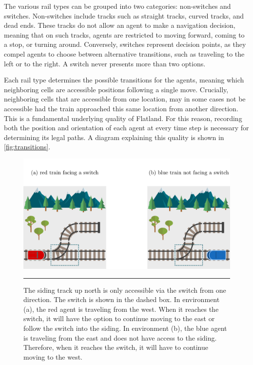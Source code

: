 \documentclass[11pt]{article}
\begin{document}
The various rail types can be grouped into two categories: non-switches and switches.  Non-switches include tracks such as straight tracks, curved tracks, and dead ends.  These tracks do not allow an agent to make a navigation decision, meaning that on such tracks, agents are restricted to moving forward, coming to a stop, or turning around.  Conversely, switches represent decision points, as they compel agents to choose between alternative transitions, such as traveling to the left or to the right.  A switch never presents more than two options.

Each rail type determines the possible transitions for the agents, meaning which neighboring cells are accessible positions following a single move.  Crucially, neighboring cells that are accessible from one location, may in some cases not be accessible had the train approached this same location from another direction.  This is a fundamental underlying quality of Flatland.  For this reason, recording both the position and orientation of each agent at every time step is necessary for determining its legal paths.  A diagram explaining this quality is shown in \autoref{fig:transitions}.

\begin{figure}[t]
\centering
\includegraphics[width=\textwidth]{transitions}
\caption{The siding track up north is only accessible via the switch from one direction.  The switch is shown in the dashed box.  In environment (a), the red agent is traveling from the west.  When it reaches the switch, it will have the option to continue moving to the east or follow the switch into the siding.  In environment (b), the blue agent is traveling from the east and does not have access to the siding.  Therefore, when it reaches the switch, it will have to continue moving to the west.}

\begin{center}
{\color{lightgray} \rule{\linewidth}{0.15mm}}
\end{center}

\label{fig:transitions}
\end{figure}
\end{document}
